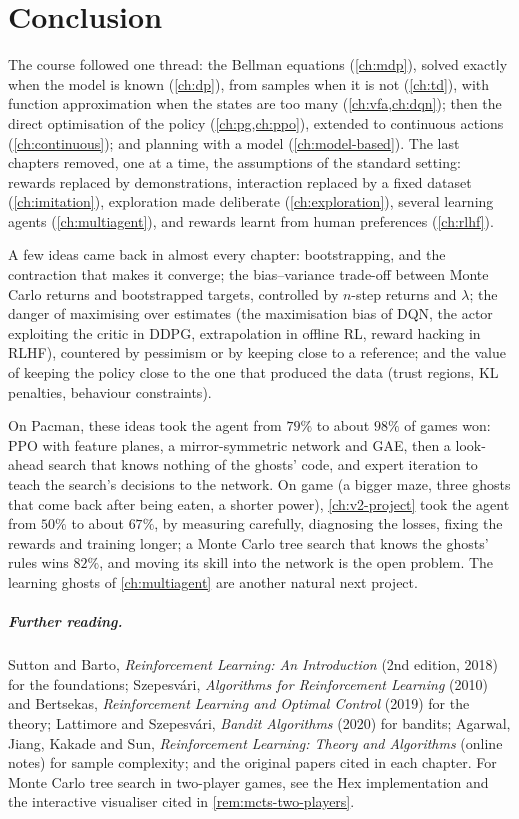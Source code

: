 \chapter{Conclusion}

The course followed one thread: the Bellman equations (\cref{ch:mdp}),
solved exactly when the model is known (\cref{ch:dp}), from samples when it
is not (\cref{ch:td}), with function approximation when the states are too
many (\cref{ch:vfa,ch:dqn}); then the direct optimisation of the policy
(\cref{ch:pg,ch:ppo}), extended to continuous actions (\cref{ch:continuous});
and planning with a model (\cref{ch:model-based}). The last chapters
removed, one at a time, the assumptions of the standard setting: rewards
replaced by demonstrations, interaction replaced by a fixed dataset
(\cref{ch:imitation}), exploration made deliberate (\cref{ch:exploration}),
several learning agents (\cref{ch:multiagent}), and rewards learnt from
human preferences (\cref{ch:rlhf}).

A few ideas came back in almost every chapter: bootstrapping, and the
contraction that makes it converge; the bias--variance trade-off between
Monte Carlo returns and bootstrapped targets, controlled by $n$-step returns
and $\lambda$; the danger of maximising over estimates (the maximisation
bias of DQN, the actor exploiting the critic in DDPG, extrapolation in
offline RL, reward hacking in RLHF), countered by pessimism or by keeping
close to a reference; and the value of keeping the policy close to the one
that produced the data (trust regions, KL penalties, behaviour constraints).

On Pacman, these ideas took the agent from $79\%$ to about $98\%$ of games
won: PPO with feature planes, a mirror-symmetric network and GAE, then a
look-ahead search that knows nothing of the ghosts' code, and expert
iteration to teach the search's decisions to the network. On game
 (a bigger maze, three ghosts that come back after being eaten, a
shorter power), \cref{ch:v2-project} took the agent from $50\%$ to about
$67\%$, by measuring carefully, diagnosing the losses, fixing the rewards
and training longer; a Monte Carlo tree search that knows the ghosts' rules wins
$82\%$, and moving its skill into
the network is the open problem. The learning ghosts of
\cref{ch:multiagent} are another natural next project.

\paragraph{Further reading.} Sutton and Barto, \emph{Reinforcement
Learning: An Introduction} (2nd edition, 2018) for the foundations;
Szepesv\'ari, \emph{Algorithms for Reinforcement Learning} (2010) and
Bertsekas, \emph{Reinforcement Learning and Optimal Control} (2019) for the
theory; Lattimore and Szepesv\'ari, \emph{Bandit Algorithms} (2020) for
bandits; Agarwal, Jiang, Kakade and Sun, \emph{Reinforcement Learning:
Theory and Algorithms} (online notes) for sample complexity; and the
original papers cited in each chapter. For Monte Carlo tree search in
two-player games, see the Hex implementation and the interactive
visualiser cited in \cref{rem:mcts-two-players}.
